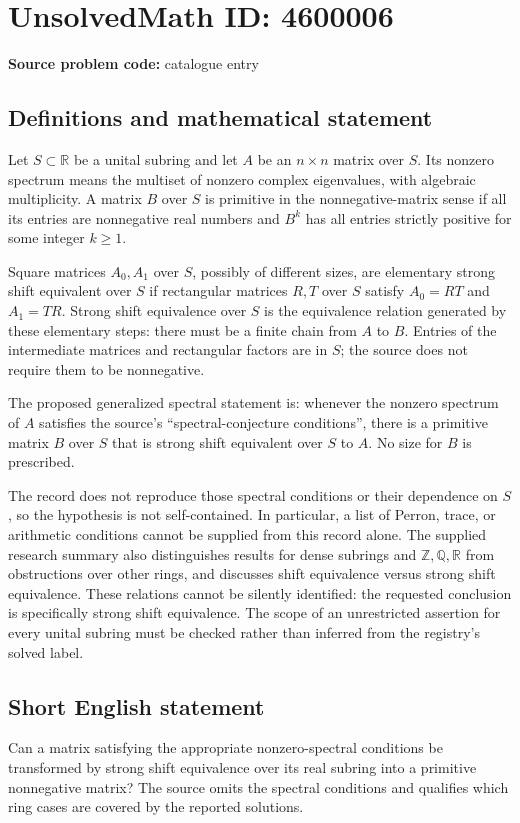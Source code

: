 \documentclass[11pt]{article}
\newcommand{\Z}{\mathbb{Z}}
\newcommand{\Q}{\mathbb{Q}}
\newcommand{\R}{\mathbb{R}}
\begin{document}
\section*{UnsolvedMath ID: 4600006}
\textbf{Source problem code:} catalogue entry
\subsection{Definitions and mathematical statement}
Let $S\subset\R$ be a unital subring and let $A$ be an $n\times n$ matrix over $S$. Its nonzero spectrum means the multiset of nonzero complex eigenvalues, with algebraic multiplicity. A matrix $B$ over $S$ is primitive in the nonnegative-matrix sense if all its entries are nonnegative real numbers and $B^k$ has all entries strictly positive for some integer $k\geq1$.

Square matrices $A_0,A_1$ over $S$, possibly of different sizes, are elementary strong shift equivalent over $S$ if rectangular matrices $R,T$ over $S$ satisfy $A_0=RT$ and $A_1=TR$. Strong shift equivalence over $S$ is the equivalence relation generated by these elementary steps: there must be a finite chain from $A$ to $B$. Entries of the intermediate matrices and rectangular factors are in $S$; the source does not require them to be nonnegative.

The proposed generalized spectral statement is: whenever the nonzero spectrum of $A$ satisfies the source's ``spectral-conjecture conditions'', there is a primitive matrix $B$ over $S$ that is strong shift equivalent over $S$ to $A$. No size for $B$ is prescribed.

The record does not reproduce those spectral conditions or their dependence on $S$, so the hypothesis is not self-contained. In particular, a list of Perron, trace, or arithmetic conditions cannot be supplied from this record alone. The supplied research summary also distinguishes results for dense subrings and $\Z,\Q,\R$ from obstructions over other rings, and discusses shift equivalence versus strong shift equivalence. These relations cannot be silently identified: the requested conclusion is specifically strong shift equivalence. The scope of an unrestricted assertion for every unital subring must be checked rather than inferred from the registry's solved label.
\subsection{Short English statement}
Can a matrix satisfying the appropriate nonzero-spectral conditions be transformed by strong shift equivalence over its real subring into a primitive nonnegative matrix? The source omits the spectral conditions and qualifies which ring cases are covered by the reported solutions.
\end{document}
